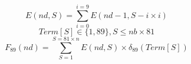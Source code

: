 \documentclass[10pt,a4paper]{letter}
\begin{document}
$$ E(nd,S)=\sum_{i=0}^{i=9}E(nd-1,S-i\times i) $$
$$ Term[S]\in \{1,89\} , S\leq nb\times 81 $$
$$ F_{89}(nd) = \sum_{S=1}^{S=81\times n}E(nd,S)\times\delta_{89}(Term[S]) $$	
\end{document}
